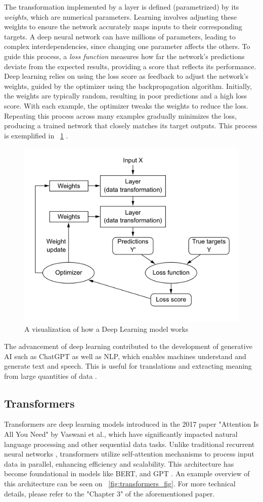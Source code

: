 \documentclass[licencjacka,en]{pracamgr}
\begin{document}
The transformation implemented by a layer is defined (parametrized) by its \textit{weights}, which are numerical parameters. Learning involves adjusting these weights to ensure the network accurately maps inputs to their corresponding targets. A deep neural network can have millions of parameters, leading to complex interdependencies, since changing one parameter affects the others. To guide this process, a \textit{loss function} measures how far the network's predictions deviate from the expected results, providing a score that reflects its performance. Deep learning relies on using the loss score as feedback to adjust the network's weights, guided by the optimizer using the backpropagation algorithm. Initially, the weights are typically random, resulting in poor predictions and a high loss score. With each example, the optimizer tweaks the weights to reduce the loss. Repeating this process across many examples gradually minimizes the loss, producing a trained network that closely matches its target outputs. This process is exemplified in ~\ref{fig:nn_function} \cite{francuz_9}.

\begin{figure}
    \centering
    \includegraphics[width=0.5\linewidth]{bachelor_images/nn_function.png}
    \caption{A visualization of how a Deep Learning model works \cite{francuz_9}}
    \label{fig:nn_function}
\end{figure}

The advancement of deep learning contributed to the development of generative AI such as ChatGPT as well as NLP, which enables machines understand and generate text and speech. This is useful for translations and extracting meaning from large quantities of data \cite{ibm_dl}.

\subsection{Transformers}
Transformers are deep learning models introduced in the 2017 paper "Attention Is All You Need" \cite{attention} by Vaswani et al., which have significantly impacted natural language processing and other sequential data tasks. Unlike traditional recurrent neural networks \cite{RNN}, transformers utilize self-attention mechanisms to process input data in parallel, enhancing efficiency and scalability. This architecture has become foundational in models like BERT, and GPT \cite{medium_t}. An example overview of this architecture can be seen on ~\ref{fig:transformers_fig}. For more technical details, please refer to the "Chapter 3" of the aforementioned paper.
\end{document}
